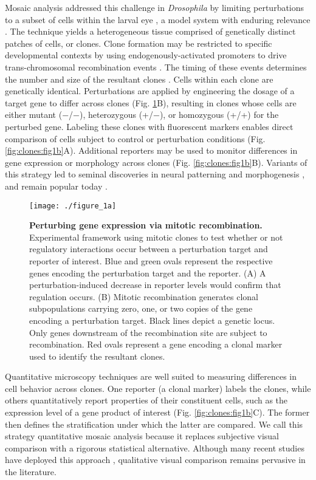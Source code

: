 Mosaic analysis addressed this challenge in \textit{Drosophila} by limiting perturbations to a subset of cells within the larval eye \cite{Xu1993,Xu2012}, a model system with enduring relevance \cite{Beira2016}. The technique yields a heterogeneous tissue comprised of genetically distinct patches of cells, or clones. Clone formation may be restricted to specific developmental contexts by using endogenously-activated promoters to drive trans-chromosomal recombination events \cite{Newsome2000,Theodosiou1998}. The timing of these events determines the number and size of the resultant clones \cite{Struhl1993}. Cells within each clone are genetically identical. Perturbations are applied by engineering the dosage of a target gene to differ across clones (Fig. \ref{fig:clones:fig1a}B), resulting in clones whose cells are either mutant (−/−), heterozygous (+/−), or homozygous (+/+) for the perturbed gene. Labeling these clones with fluorescent markers enables direct comparison of cells subject to control or perturbation conditions (Fig. \ref{fig:clones:fig1b}A). Additional reporters may be used to monitor differences in gene expression or morphology across clones (Fig. \ref{fig:clones:fig1b}B). Variants of this strategy led to seminal discoveries in neural patterning \cite{Halfar2001,Tomlinson2001,Yang2001} and morphogenesis \cite{Huang2005,Thompson2006}, and remain popular today \cite{Atkins2019,Enomoto2018,Germani2018}.

\begin{figure}[!h]
\centering
\texttt{[image: ./figure\_1a]}
\caption[Perturbing gene expression via mitotic recombination.]{\textbf{Perturbing gene expression via mitotic recombination.} Experimental framework using mitotic clones to test whether or not regulatory interactions occur between a perturbation target and reporter of interest. Blue and green ovals represent the respective genes encoding the perturbation target and the reporter. (A) A perturbation-induced decrease in reporter levels would confirm that regulation occurs. (B) Mitotic recombination generates clonal subpopulations carrying zero, one, or two copies of the gene encoding a perturbation target. Black lines depict a genetic locus. Only genes downstream of the recombination site are subject to recombination. Red ovals represent a gene encoding a clonal marker used to identify the resultant clones.}
\label{fig:clones:fig1a}
\end{figure}

Quantitative microscopy techniques are well suited to measuring differences in cell behavior across clones. One reporter (a clonal marker) labels the clones, while others quantitatively report properties of their constituent cells, such as the expression level of a gene product of interest (Fig. \ref{fig:clones:fig1b}C). The former then defines the stratification under which the latter are compared. We call this strategy quantitative mosaic analysis because it replaces subjective visual comparison with a rigorous statistical alternative. Although many recent studies have deployed this approach \cite{Dai2017,Bernasek2018,Ghiglione2018,Li2018}, qualitative visual comparison remains pervasive in the literature.

